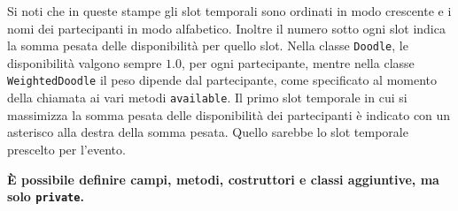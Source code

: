 \documentclass{article}[10pt]
\begin{document}
\noindent
Si noti che in queste stampe gli slot temporali sono ordinati in modo crescente e i nomi dei partecipanti in modo alfabetico.
Inoltre il numero sotto ogni slot indica la somma pesata delle disponibilit\`a per quello slot.
Nella classe \texttt{Doodle}, le disponibilit\`a valgono sempre $1.0$, per ogni partecipante, mentre
nella classe \texttt{WeightedDoodle} il peso dipende dal partecipante, come specificato al momento della
chiamata ai vari metodi \texttt{available}. Il primo slot temporale in cui si massimizza la somma
pesata delle disponibilit\`a dei partecipanti \`e indicato con un asterisco alla destra della somma pesata.
Quello sarebbe lo slot temporale prescelto per l'evento.

\begin{center}
\textbf{\`E possibile definire campi, metodi, costruttori e classi aggiuntive, ma solo \texttt{private}.}
\end{center}
\end{document}
